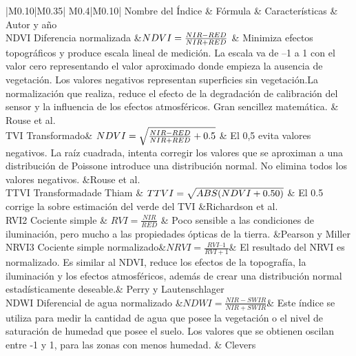 \begin{table}[H]
    \centering
    \begin{tabular}{|M{0.10\textwidth}|M{0.35\textwidth}|
   M{0.4\textwidth}|M{0.10\textwidth}| } 
        \hline Nombre del Índice & Fórmula & Características & Autor y año \\ \hline
  NDVI Diferencia normalizada &$ \scriptsize{NDVI = \frac{NIR-RED}{NIR+RED}} $ & \scriptsize {Minimiza efectos topográficos y produce escala lineal de medición. La escala va de –1 a 1 con el valor cero representando el valor aproximado donde empieza la ausencia de vegetación. Los valores negativos representan superficies sin vegetación.La normalización que realiza, reduce el efecto de la degradación de calibración del sensor y la influencia de los efectos atmosféricos. Gran sencillez matemática.} & Rouse et al.\cite{rouse1973monitoring} \\\hline 
  TVI Transformado& $\scriptsize{NDVI =\sqrt{ \frac{NIR-RED}{NIR+RED}+0.5 }} $ & \scriptsize{El 0,5 evita valores negativos. La raíz cuadrada, intenta corregir los valores que se aproximan a una distribución de Poissone introduce una distribución normal. No elimina todos los valores negativos.} &Rouse et al. \cite{rouse1973monitoring}\\ \hline
 TTVI Transformadade Thiam & $\scriptsize{TTVI = \sqrt{ABS(NDVI + 0.50)}}$ & \scriptsize{El 0.5 corrige la sobre estimación del verde del TVI} &Richardson et al. \cite{richardson1977distinguishing} \\ \hline
 RVI2 Cociente simple & $RVI =\frac{NIR}{RED} $ & \scriptsize{Poco sensible a las condiciones de iluminación, pero mucho a las propiedades ópticas de la tierra.} &Pearson y Miller \cite{pearson1972remote} \\ \hline 
 NRVI3 Cociente simple normalizado&$NRVI = \frac{RVI –1}{RVI + 1}$& \scriptsize{El resultado del NRVI es normalizado. Es similar al NDVI, reduce los efectos de la topografía, la iluminación y los efectos atmosféricos, además de crear una distribución  normal  estadísticamente deseable.}& Perry y Lautenschlager \cite{perry1984functional} \\ \hline 
 NDWI Diferencial de agua normalizado &$NDWI = \frac{NIR -SWIR}{NIR+SWIR} $& \scriptsize{Este índice se utiliza para medir la cantidad de agua que posee la vegetación o el nivel de saturación de humedad que posee el suelo. Los valores que se obtienen oscilan entre -1 y 1, para las zonas con menos humedad}. & Clevers \cite{clevers1988derivation}\\ \hline 
    \end{tabular}
    \caption{Tabla de Índices de Vegetación}
    \label{tab:my_label}
\end{table}

